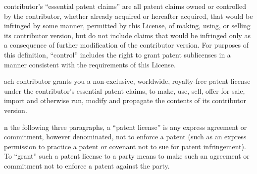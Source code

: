 \documentclass{article}
\begin{document}
 contributor's ``essential patent claims'' are all patent claims owned or controlled by the contributor, whether already acquired or hereafter acquired, that would be infringed by some manner, permitted by this License, of making, using, or selling its contributor version, but do not include claims that would be infringed only as a consequence of further modification of the contributor version. For purposes of this definition, ``control'' includes the right to grant patent sublicenses in a manner consistent with the requirements of this License.

ach contributor grants you a non-exclusive, worldwide, royalty-free patent license under the contributor's essential patent claims, to make, use, sell, offer for sale, import and otherwise run, modify and propagate the contents of its contributor version.

n the following three paragraphs, a ``patent license'' is any express agreement or commitment, however denominated, not to enforce a patent (such as an express permission to practice a patent or covenant not to sue for patent infringement). To ``grant'' such a patent license to a party means to make such an agreement or commitment not to enforce a patent against the party.
\end{document}
